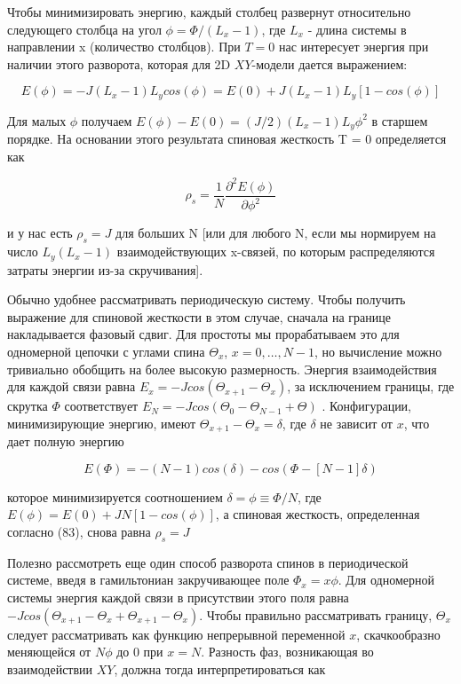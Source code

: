 \documentclass[11pt]{article}
\begin{document}
Чтобы минимизировать энергию, каждый столбец развернут относительно следующего столбца на угол $\phi = \Phi / (L_x - 1)$, где $L_x$ - длина системы в направлении x (количество столбцов). При $T = 0$ нас интересует энергия при наличии этого разворота, которая для 2D $XY$-модели дается выражением:

\begin{equation}
E(\phi) = -J(L_x-1)L_y cos(\phi) = E(0)+J(L_x - 1)L_y[1-cos(\phi)]
\label{eq_82}
\end{equation}

Для малых $\phi$ получаем $E (\phi) - E (0) = (J / 2) (L_x - 1) L_y \phi^2$ в старшем порядке. На основании этого результата спиновая жесткость T = 0 определяется как

\begin{equation}
\rho_s = \frac{1}{N}\frac{\partial^2 E(\phi)}{\partial\phi^2}
\label{eq_83}
\end{equation}

и у нас есть $\rho_s = J$ для больших N [или для любого N, если мы нормируем на число $L_y (L_x - 1)$ взаимодействующих x-связей, по которым распределяются затраты энергии из-за скручивания].

Обычно удобнее рассматривать периодическую систему. Чтобы получить выражение для спиновой жесткости в этом случае, сначала на границе накладывается фазовый сдвиг. Для простоты мы прорабатываем это для одномерной цепочки с углами спина $\Theta_x$, $x = 0,\dots, N - 1$, но вычисление можно тривиально обобщить на более высокую размерность. Энергия взаимодействия для каждой связи равна $E_x = −J cos (\Theta_{ x + 1} - \Theta_x)$, за исключением границы, где скрутка $\Phi$ соответствует $E_N = −J cos (\Theta_0 − \Theta_{N − 1} + \Theta)$ . Конфигурации, минимизирующие энергию, имеют $ \Theta_{x + 1} - \Theta_x = \delta$, где $\delta$ не зависит от $x$, что дает полную энергию

\begin{equation}
E(\Phi) = -(N-1)cos(\delta)-cos(\Phi-[N-1]\delta)
\label{eq_84}
\end{equation}

которое минимизируется соотношением $\delta = \phi \equiv \Phi / N$, где $E (\phi) = E (0) + JN [1 - cos (\phi)]$, а спиновая жесткость, определенная согласно (83), снова равна $\rho_s = J$

Полезно рассмотреть еще один способ разворота спинов в периодической системе, введя в гамильтониан закручивающее поле $\Phi_x = x\phi$. Для одномерной системы энергия каждой связи в присутствии этого поля равна $−J cos (\Theta_{x + 1} - \Theta_x + \Theta_{x + 1} - \Theta_x)$. Чтобы правильно рассматривать границу, $\Theta_x$ следует рассматривать как функцию непрерывной переменной $x$, скачкообразно меняющейся от $N\phi$ до 0 при $x = N$. Разность фаз, возникающая во взаимодействии $XY$, должна тогда интерпретироваться как
\end{document}
